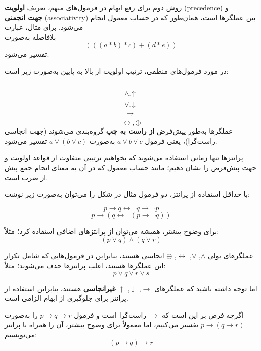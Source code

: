      روش دوم برای رفع ابهام در فرمول‌های مبهم، تعریف \textbf{اولویت} (precedence) و \\ \textbf{جهت انجمنی} (associativity) بین عملگرها است، همان‌طور که در حساب معمول انجام می‌شود. برای مثال، عبارت \\  بلافاصله به‌صورت \[
     (((a * b) * c) + (d * e))
     \] تفسیر می‌شود.
     
     در مورد فرمول‌های منطقی، ترتیب اولویت از بالا به پایین به‌صورت زیر است:
     
     \[ \\
     \neg \\
     \]
     \[
     \land, \uparrow \\
     \]
     \[
     \lor, \downarrow \\
     \]
     \[
     \rightarrow \\
     \]
     \[
     \leftrightarrow, \oplus
     \]
     عملگرها به‌طور پیش‌فرض \textbf{از راست به چپ} گروه‌بندی می‌شوند (جهت انجاسی راست‌گرا)، یعنی فرمول $a \lor b \lor c$ به‌صورت $a \lor (b \lor c)$ تفسیر می‌شود.
     
     پرانتزها تنها زمانی استفاده می‌شوند که بخواهیم ترتیبی متفاوت از قواعد اولویت و جهت پیش‌فرض را نشان دهیم؛ مانند حساب معمول که در آن  به معنای انجام جمع پیش از ضرب است.
     
     با حداقل استفاده از پرانتز، دو فرمول مثال در شکل  را می‌توان به‌صورت زیر نوشت:
     
     \[
     p \rightarrow q \leftrightarrow \neg q \rightarrow \neg p
     \]
     \[
     p \rightarrow (q \leftrightarrow \neg (p \rightarrow \neg q))
     \]
     
     برای وضوح بیشتر، همیشه می‌توان از پرانتزهای اضافی استفاده کرد؛ مثلاً:
     \[
     (p \lor q) \land (q \lor r)
     \]
     
     عملگرهای بولی $\land$, $\lor$, $\leftrightarrow$, $\oplus$ انجاسی هستند، بنابراین در فرمول‌هایی که شامل تکرار این عملگرها هستند، اغلب پرانتزها حذف می‌شوند؛ مثلاً:
     \[
     p \lor q \lor r \lor s
     \]
     
     اما توجه داشته باشید که عملگرهای $\rightarrow$, $\downarrow$, $\uparrow$ \textbf{غیرانجاسی} هستند، بنابراین استفاده از پرانتز برای جلوگیری از ابهام الزامی است.
     
     اگرچه فرض بر این است که $\rightarrow$ راست‌گرا است و فرمول $p \rightarrow q \rightarrow r$ را به‌صورت $p \rightarrow (q \rightarrow r)$ تفسیر می‌کنیم، اما معمولاً برای وضوح بیشتر، آن را همراه با پرانتز می‌نویسیم:
     \[
     (p \rightarrow q) \rightarrow r
     \]
     
